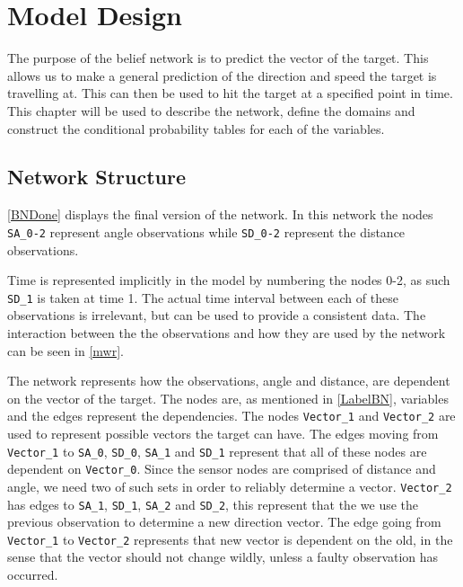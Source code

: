 \chapter{Model Design}

The purpose of the belief network is to predict the vector of the
target. This allows us to make a general prediction of the direction and speed
the target is travelling at. This can then be used to hit the target at a
specified point in time. This chapter will be used to describe the network,
define the domains and construct the conditional probability tables for each of
the variables.

\section{Network Structure}
\autoref{BNDone} displays the final version of the network. In this network the
nodes \texttt{SA\_0-2} represent angle observations while \texttt{SD\_0-2}
represent the distance observations.


Time is represented implicitly in the model by numbering the nodes 0-2, as such
\texttt{SD\_1} is taken at time 1. The actual time interval between each of
these observations is irrelevant, but can be used to provide a consistent data.
The interaction between the the observations and how they are used by the
network can be seen in \autoref{mwr}.


The network represents how the observations, angle and distance, are dependent
on the vector of the target. The nodes are, as mentioned in \autoref{LabelBN},
variables and the edges represent the dependencies. The nodes
\texttt{Vector\_1} and \texttt{Vector\_2} are used to represent possible
vectors the target can have. The edges moving from \texttt{Vector\_1} to
\texttt{SA\_0}, \texttt{SD\_0}, \texttt{SA\_1} and \texttt{SD\_1} represent
that all of these nodes are dependent on \texttt{Vector\_0}. Since the sensor
nodes are comprised of distance and angle, we need two of such sets in order to
reliably determine a vector. \texttt{Vector\_2} has edges to \texttt{SA\_1},
\texttt{SD\_1}, \texttt{SA\_2} and \texttt{SD\_2}, this represent that the we
use the previous observation to determine a new direction vector. The edge
going from \texttt{Vector\_1} to \texttt{Vector\_2} represents that new vector
is dependent on the old, in the sense that the vector should not change wildly,
unless a faulty observation has occurred.

